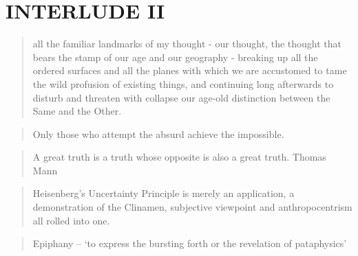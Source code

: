 
\pagestyle{empty}

\chapter*{INTERLUDE II}
\label{interlude2}



\begin{quotation}
  all the familiar landmarks of my thought - our thought, the thought that bears the stamp of our age and our geography - breaking up all the ordered surfaces and all the planes with which we are accustomed to tame the wild profusion of existing things, and continuing long afterwards to disturb and threaten with collapse our age-old distinction between the Same and the Other. 
\end{quotation}

\begin{quotation}
    Only those who attempt the absurd achieve the impossible. 
\end{quotation}

\begin{quotation}
    A great truth is a truth whose opposite is also a great truth. Thomas Mann 
\end{quotation}

\begin{quotation}
    Heisenberg's Uncertainty Principle is merely an application, a demonstration of the Clinamen, subjective viewpoint and anthropocentrism all rolled into one. 
\end{quotation}

\begin{quotation}
  Epiphany – `to express the bursting forth or the revelation of pataphysics' 
\end{quotation}

\clearpage